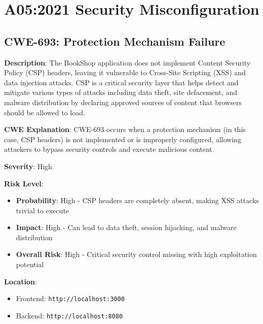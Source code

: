\documentclass[]{UCD_CS_FYP_Report}
\begin{document}
\maketitle


\tableofcontents{}\newpage
\newpage



\chapter{A05:2021 Security Misconfiguration}

\section{CWE-693: Protection Mechanism Failure}

\textbf{Description}: The BookShop application does not implement Content Security Policy (CSP) headers, leaving it vulnerable to Cross-Site Scripting (XSS) and data injection attacks. CSP is a critical security layer that helps detect and mitigate various types of attacks including data theft, site defacement, and malware distribution by declaring approved sources of content that browsers should be allowed to load.

\textbf{CWE Explanation}: CWE-693 occurs when a protection mechanism (in this case, CSP headers) is not implemented or is improperly configured, allowing attackers to bypass security controls and execute malicious content.

\textbf{Severity}: High

\textbf{Risk Level}: 
\begin{itemize}
    \item \textbf{Probability}: High - CSP headers are completely absent, making XSS attacks trivial to execute
    \item \textbf{Impact}: High - Can lead to data theft, session hijacking, and malware distribution
    \item \textbf{Overall Risk}: High - Critical security control missing with high exploitation potential
\end{itemize}

\textbf{Location}: 
\begin{itemize}
    \item Frontend: \texttt{http://localhost:3000}
    \item Backend: \texttt{http://localhost:8080}
\end{itemize}
\end{document}
